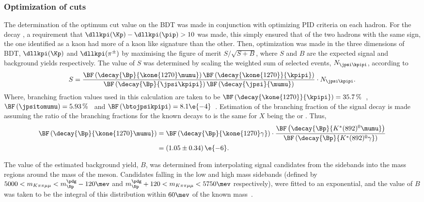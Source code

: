 \subsubsection[Optimization of \btokpipimumu cuts]
{Optimization of \tmath{\btokpipimumu} cuts}
The determination of the optimum cut value on the BDT was made in conjunction with optimizing PID
criteria on each hadron.
For the decay \btokpipimumu, a requirement that $\dllkpi(\Kp)-\dllkpi(\pip)>10$ was made, this
simply ensured that of the two hadrons with the same sign, the one identified as a kaon had more of
a kaon like signature than the other.
Then, optimization was made in the three dimensions of BDT, $\dllkpi(\Kp)$ and $\dllkpi(\pi^\pm)$
by maximising the figure of merit $S/\sqrt{S+B}$, where $S$ and $B$ are the expected signal and
background yields respectively.
The value of $S$ was determined by scaling the weighted sum of selected \btojpsikpipi events,
$N_{\jpsi\kpipi}$, according to
\begin{equation}
  S =
  \frac{
    \BF\left(\decay{\Bp}{\kone{1270}\mumu}\right)
    \BF\left(\decay{\kone{1270}}{\kpipi}\right)
  }{
    \BF\left(\decay{\Bp}{\jpsi\kpipi}\right)
    \BF\left(\decay{\jpsi}{\mumu}\right)
  }
  \cdot
  N_{\jpsi\kpipi}.
\end{equation}
Where, branching fraction values used in this calculation are taken to be
$\BF\left(\decay{\kone{1270}}{\kpipi}\right) = 35.7\,\%$~\cite{PDG2012},
$\BF\left(\jpsitomumu\right) = 5.93\,\%$~\cite{PDG2012} and
$\BF\left(\btojpsikpipi\right) = 8.1\e{-4}$~\cite{PDG2012}.
Estimation of the branching fraction of the signal decay  is made
assuming the ratio of the branching fractions for the known decays  to
is the same for $X$ being the  or \Kstarent.
Thus,
\begin{align}
  \BF\left(\decay{\Bp}{\kone{1270}\mumu}\right)
  &=
  \BF\left(\decay{\Bp}{\kone{1270}\gamma}\right)
  \cdot\frac{
    \BF\left(\decay{\Bp}{K^*(892)^0\mumu}\right)
  }{
  \BF\left(\decay{\Bp}{K^*(892)^0\gamma}\right)
  }\nonumber\\
  &=\left(1.05\pm0.34\right)\e{-6}.
\end{align}


The value of the estimated background yield, $B$, was determined from interpolating signal
\btokpipimumu candidates from the sidebands into the mass regions around the mass of the \Bp meson.
Candidates falling in the low and high mass sidebands
(defined by $5000<m_{K\pi\pi\mu\mu}<m_{\Bp}^\pdg-120\mev$ and
$m_{\Bp}^\pdg+120<m_{K\pi\pi\mu\mu}<5750\mev$ respectively),
were fitted to an exponential, and the value of $B$ was taken to be the integral of this
distribution within $60\mev$ of the known \Bp mass~\cite{PDG2012}.


